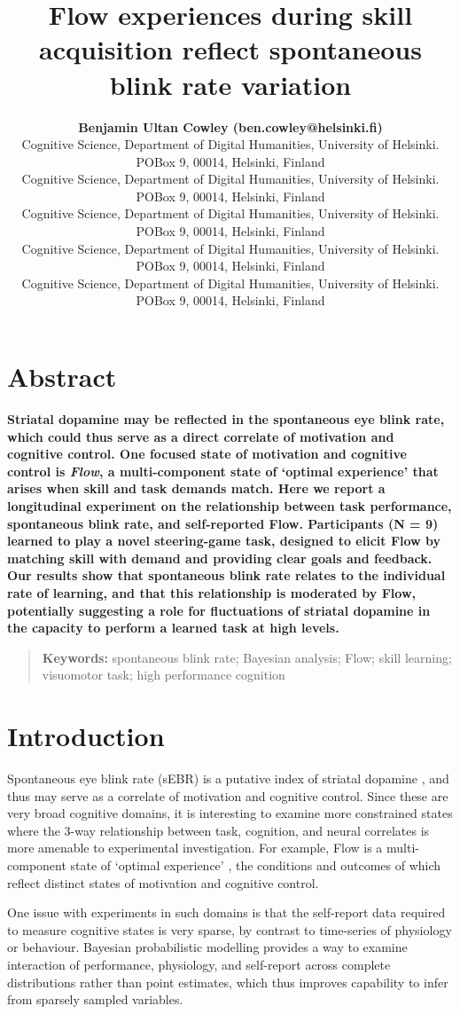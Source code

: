 \documentclass[10pt,letterpaper,floatsintext]{article}
\title{Flow experiences during skill acquisition reflect spontaneous blink rate variation}
\author{{\large \bf Benjamin Ultan Cowley (ben.cowley@helsinki.fi)} \\
  Cognitive Science, Department of Digital Humanities, University of Helsinki. POBox 9, 00014, Helsinki, Finland
  \AND {\large \bf Roosa Frantsi (roosa.frantsi@helsinki.fi)} \\
	  Cognitive Science, Department of Digital Humanities, University of Helsinki. POBox 9, 00014, Helsinki, Finland
  \AND {\large \bf Pasi P\"{o}l\"{o}nen (pasi.polonen@helsinki.fi)} \\
	  Cognitive Science, Department of Digital Humanities, University of Helsinki. POBox 9, 00014, Helsinki, Finland
  \AND {\large \bf Ville-Pekka Inkil\"{a} (ville-pekka.inkile@helsinki.fi)} \\
	  Cognitive Science, Department of Digital Humanities, University of Helsinki. POBox 9, 00014, Helsinki, Finland
  \AND {\large \bf Jussi Palom\"{a}ki (jussi.palomaki@helsinki.fi)} \\
	  Cognitive Science, Department of Digital Humanities, University of Helsinki. POBox 9, 00014, Helsinki, Finland
  }
\begin{document}
\maketitle


\section{Abstract}
{
\bf
Striatal dopamine may be reflected in the spontaneous eye blink rate, which could thus serve as a direct correlate of motivation and cognitive control. One focused state of motivation and cognitive control is \textit{Flow}, a multi-component state of `optimal experience' that arises when skill and task demands match. Here we report a longitudinal experiment on the relationship between task performance, spontaneous blink rate, and self-reported Flow. Participants (N = 9) learned to play a novel steering-game task, designed to elicit Flow by matching skill with demand and providing clear goals and feedback. Our results show that spontaneous blink rate relates to the individual rate of learning, and that this relationship is moderated by Flow, potentially suggesting a role for fluctuations of striatal dopamine in the capacity to perform a learned task at high levels.
}
\begin{quote}
\small
\textbf{Keywords:}
spontaneous blink rate; Bayesian analysis; Flow; skill learning; visuomotor task; high performance cognition
\end{quote}


\section{Introduction}

Spontaneous eye blink rate (sEBR) is a putative index of striatal dopamine \cite{Slagter2012}, and thus may serve as a correlate of motivation and cognitive control. Since these are very broad cognitive domains, it is interesting to examine more constrained states where the 3-way relationship between task, cognition, and neural correlates is more amenable to experimental investigation. For example, Flow is a multi-component state of `optimal experience' \cite{Csikszentmihalyi1975}, the conditions and outcomes of which reflect distinct states of motivation and cognitive control.

One issue with experiments in such domains is that the self-report data required to measure cognitive states is very sparse, by contrast to time-series of physiology or behaviour. Bayesian probabilistic modelling provides a way to examine interaction of performance, physiology, and self-report across complete distributions rather than point estimates, which thus improves capability to infer from sparsely sampled variables.
\end{document}
